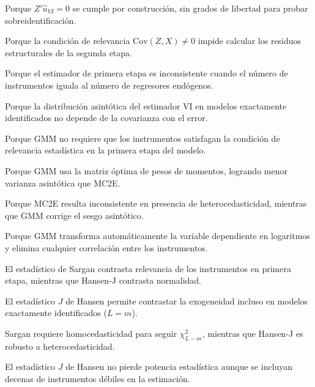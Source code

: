 \begin{opts}
    \item Porque $Z'\hat{u}_{VI} = 0$ se cumple por construcción, sin grados de libertad para probar sobreidentificación.
    \item Porque la condición de relevancia $\text{Cov}(Z, X) \neq 0$ impide calcular los residuos estructurales de la segunda etapa.
    \item Porque el estimador de primera etapa es inconsistente cuando el número de instrumentos iguala al número de regresores endógenos.
    \item Porque la distribución asintótica del estimador VI en modelos exactamente identificados no depende de la covarianza con el error.
\end{opts}

\begin{opts}
    \item Porque GMM no requiere que los instrumentos satisfagan la condición de relevancia estadística en la primera etapa del modelo.
    \item Porque GMM usa la matriz óptima de pesos de momentos, logrando menor varianza asintótica que MC2E.
    \item Porque MC2E resulta inconsistente en presencia de heterocedasticidad, mientras que GMM corrige el sesgo asintótico.
    \item Porque GMM transforma automáticamente la variable dependiente en logaritmos y elimina cualquier correlación entre los instrumentos.
\end{opts}

\begin{opts}
    \item El estadístico de Sargan contrasta relevancia de los instrumentos en primera etapa, mientras que Hansen-J contrasta normalidad.
    \item El estadístico $J$ de Hansen permite contrastar la exogeneidad incluso en modelos exactamente identificados ($L = m$).
    \item Sargan requiere homocedasticidad para seguir $\chi^2_{L-m}$, mientras que Hansen-J es robusto a heterocedasticidad.
    \item El estadístico $J$ de Hansen no pierde potencia estadística aunque se incluyan decenas de instrumentos débiles en la estimación.
\end{opts}

